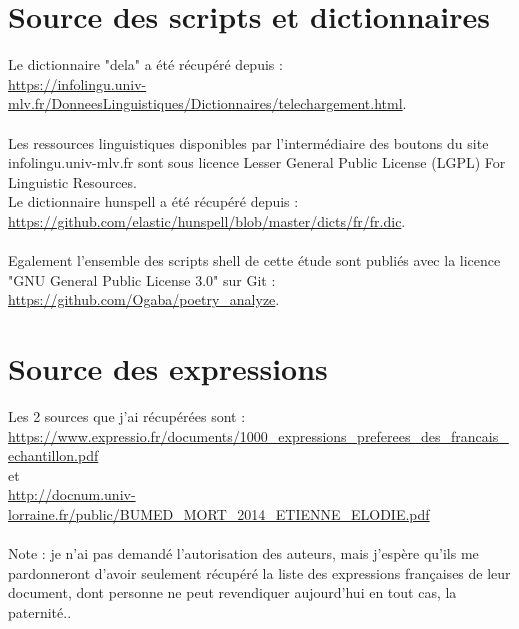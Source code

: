 \documentclass[french]{article}
\begin{document}
\begin{appendix}
\section{Source des scripts et dictionnaires}
Le dictionnaire "dela" a été récupéré depuis :\\ \url{https://infolingu.univ-mlv.fr/DonneesLinguistiques/Dictionnaires/telechargement.html}.\\
\\Les ressources linguistiques disponibles par l'intermédiaire des boutons du site infolingu.univ-mlv.fr sont sous licence Lesser General Public License (LGPL) For Linguistic Resources.\\
Le dictionnaire hunspell a été récupéré depuis :\\ \url{https://github.com/elastic/hunspell/blob/master/dicts/fr/fr.dic}.\\
\\
Egalement l'ensemble des scripts shell de cette étude sont publiés avec la licence "GNU General Public License 3.0" sur Git :\\
\url{https://github.com/Ogaba/poetry_analyze}.\\
\section{Source des expressions}
Les 2 sources que j'ai récupérées sont :\\
\url{https://www.expressio.fr/documents/1000_expressions_preferees_des_francais_echantillon.pdf}\\
et\\
\url{http://docnum.univ-lorraine.fr/public/BUMED_MORT_2014_ETIENNE_ELODIE.pdf}\\
\\Note : je n'ai pas demandé l'autorisation des auteurs, mais j'espère qu'ils me pardonneront d'avoir seulement récupéré la liste des expressions françaises de leur document, dont personne ne peut revendiquer aujourd'hui en tout cas, la paternité..
\end{appendix}
\end{document}
